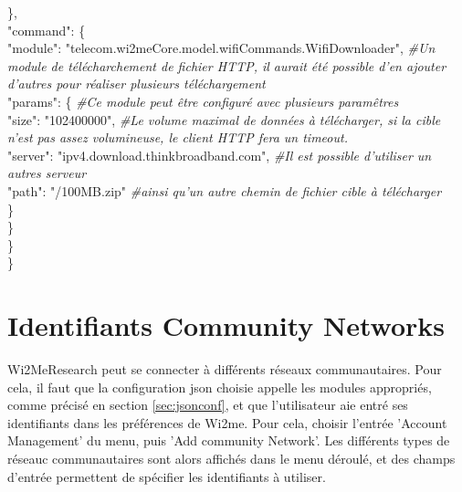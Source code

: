 \documentclass[11pt]{article}
\newcommand\mtext[2]{#1}
\newcommand\mtext[2]{#2}
\begin{document}
\hspace*{12mm}\}, \\
\hspace*{12mm}"command": \{ \\
\hspace*{18mm}"module": "telecom.wi2meCore.model.wifiCommands.WifiDownloader", 
 \textit{\#\mtext{Un module de télécharchement de fichier HTTP, il aurait été
 possible d'en ajouter d'autres pour réaliser plusieurs téléchargement}{} }\\
\hspace*{18mm}"params": \{ \textit{\#\mtext{Ce module peut être configuré avec
plusieurs paramêtres}{} } \\
\hspace*{24mm}"size": "102400000", 
 \textit{\#\mtext{Le volume maximal de données à télécharger, si la cible n'est
 pas assez volumineuse, le client HTTP fera un timeout.}{} }\\
\hspace*{24mm}"server": "ipv4.download.thinkbroadband.com", 
 \textit{\#\mtext{Il est possible d'utiliser un autres serveur}{} }\\
\hspace*{24mm}"path": "/100MB.zip" 
 \textit{\#\mtext{ainsi qu'un autre chemin de fichier cible à télécharger}{} }\\
\hspace*{18mm}\} \\
\hspace*{12mm}\} \\
\hspace*{6mm}\} \\
\} \\


\section{\mtext{Identifiants Community Networks}{Community network Credentials}}\label{starting}

\mtext{Wi2MeResearch peut se connecter à différents réseaux communautaires. Pour
cela, il faut que la configuration json choisie appelle les modules appropriés,
comme précisé en section \ref{sec:jsonconf}, et que l'utilisateur aie entré ses
identifiants dans les préférences de Wi2me. Pour cela, choisir l'entrée 'Account
Management' du menu, puis 'Add community Network'. Les différents types de
réseauc communautaires sont alors affichés dans le menu déroulé, et des champs
d'entrée permettent de spécifier les identifiants à utiliser.}{}
\end{document}
